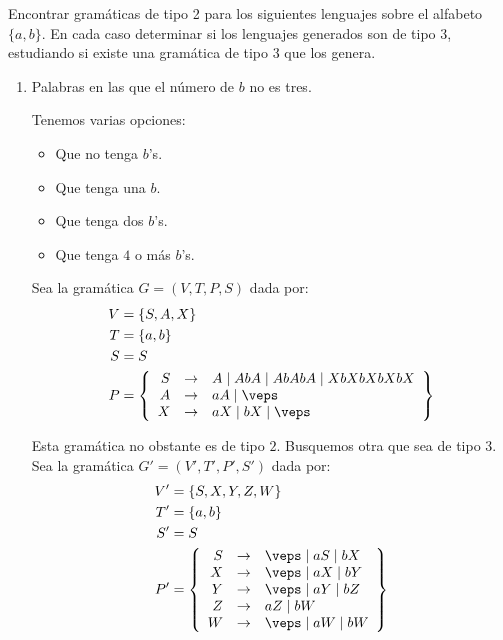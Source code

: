 \begin{ejercicio}
    Encontrar gramáticas de tipo 2 para los siguientes lenguajes sobre el alfabeto $\{a, b\}$. En cada caso determinar si los lenguajes generados son de tipo 3, estudiando si existe una gramática de tipo 3 que los genera.
    \begin{enumerate}
        \item Palabras en las que el número de $b$ no es tres.
        
        Tenemos varias opciones:
        \begin{itemize}
            \item Que no tenga $b$'s.
            \item Que tenga una $b$.
            \item Que tenga dos $b$'s.
            \item Que tenga $4$ o más $b$'s.
        \end{itemize}

        Sea la gramática $G=\left(V,T,P,S\right)$ dada por:
        \begin{align*}
            V &= \{S, A, X\} \\
            T &= \{a,b\} \\
            S &= S \\
            P &= \left\{
                \begin{array}{rcl}
                    S &\rightarrow & A \mid AbA \mid AbAbA \mid XbXbXbXbX \\
                    A &\rightarrow & aA \mid \veps \\
                    X &\rightarrow & aX \mid bX \mid \veps
                \end{array}
            \right\}
        \end{align*}

        Esta gramática no obstante es de tipo $2$. Busquemos otra que sea de tipo 3.
        Sea la gramática $G'=\left(V',T',P',S'\right)$ dada por:
        \begin{align*}
            V' &= \{S, X,Y,Z, W\} \\
            T' &= \{a,b\} \\
            S' &= S \\
            P' &= \left\{
                \begin{array}{rcl}
                    S &\rightarrow & \veps \mid aS \mid bX \\
                    X &\rightarrow & \veps \mid aX \mid bY \\
                    Y &\rightarrow & \veps \mid aY \mid bZ \\
                    Z &\rightarrow & aZ \mid bW \\
                    W &\rightarrow & \veps \mid aW \mid bW
                \end{array}
            \right\}
        \end{align*}


\end{enumerate}
\end{ejercicio}
